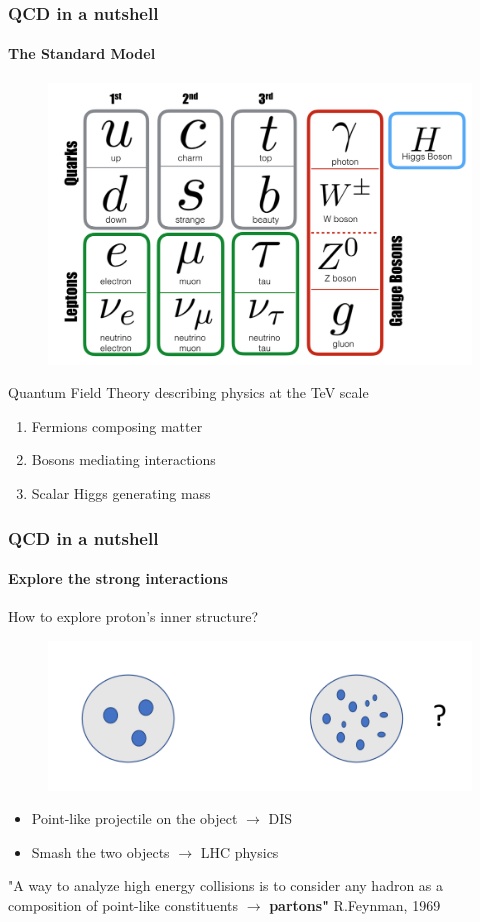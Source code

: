 \documentclass[aspectratio=43]{beamer}
\begin{document}
\begin{frame}
	

\end{frame}

\begin{frame}

	\frametitle{QCD in a nutshell}
	\framesubtitle{The Standard Model}

	\begin{figure}
		\includegraphics[width = 6 cm]{SM.png}
	\end{figure}
 
	
	Quantum Field Theory describing physics at the TeV scale
	\begin{enumerate}
		\item Fermions composing matter
		\item Bosons mediating interactions
		\item Scalar Higgs generating mass
	\end{enumerate}	
	
\end{frame}

\begin{frame}

	\frametitle{QCD in a nutshell}
	\framesubtitle{Explore the strong interactions}
	
	How to explore proton's inner structure?
	
	\begin{figure}
		\includegraphics[width = 0.5\linewidth]{protons.png}
	\end{figure}
	
	
	\begin{itemize}
		\item Point-like projectile on the object $\longrightarrow$ DIS
		\item Smash the two objects $\longrightarrow$ LHC physics
	\end{itemize}
	
	{\color{blue}"A way to analyze high energy collisions is to consider any hadron as a composition of point-like constituents $\longrightarrow$ \textbf{partons"} } R.Feynman, 1969 

\end{frame}
\end{document}
